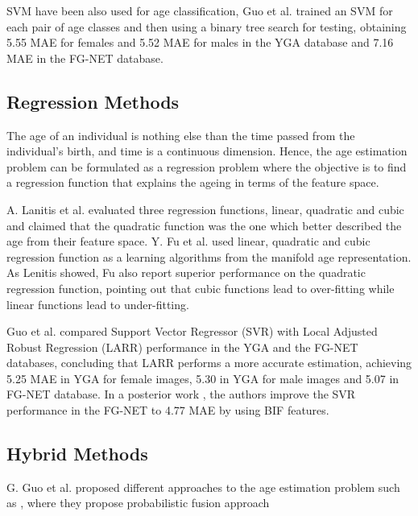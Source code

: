 SVM have been also used for age classification, Guo et al. \cite{4544009} \cite{Guo:2008:IHA:2319085.2321608} trained an SVM for each pair of age classes and then using a binary tree search for testing, obtaining 5.55 MAE for females and 5.52 MAE for males in the YGA database and 7.16 MAE in the FG-NET database. 


\subsection{Regression Methods}

The age of an individual is nothing else than the time passed from the individual's birth, and time is a continuous dimension. Hence, the age estimation problem can be formulated as a regression problem where the objective is to find a regression function that explains the ageing in terms of the feature space.

A. Lanitis et al. \cite{Lanitis:2004:CDC:2225304.2226166} evaluated three regression functions, linear, quadratic and cubic and claimed that the quadratic function was the one which better described the age from their feature space. Y. Fu et al. \cite{4523958} \cite{4284917} used linear, quadratic and cubic regression function as a learning algorithms from the manifold age representation. As Lenitis showed, Fu also report superior performance on the quadratic regression function, pointing out that cubic functions lead to over-fitting while linear functions lead to under-fitting.

Guo et al. \cite{4544009} \cite{Guo:2008:IHA:2319085.2321608} compared Support Vector Regressor (SVR) with Local Adjusted Robust Regression (LARR) performance in the YGA and the FG-NET databases, concluding that LARR performs a more accurate estimation, achieving 5.25 MAE in YGA for female images, 5.30 in YGA for male images and  5.07 in FG-NET database. In a posterior work \cite{conf/cvpr/GuoMFH09}, the authors improve the SVR performance in the FG-NET to 4.77 MAE by using BIF features.

\subsection{Hybrid Methods}


G. Guo et al. proposed different approaches to the age estimation problem such as \cite{4563041}, where they propose probabilistic fusion approach

